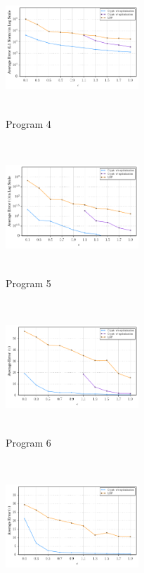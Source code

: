 \begin{figure}
          \begin{subfigure}[b]{0.3\textwidth}
    \qquad    \includegraphics[width=5cm,height=5cm]{test44.pdf}
        \caption{Program 4}
        \label{fig:mouse}\end{subfigure}
          \begin{subfigure}[b]{0.3\textwidth}
    \qquad    \includegraphics[width=5cm,height=5cm]{test55.pdf}
        \caption{Program 5}
        \label{fig:mouse}\end{subfigure}
          \begin{subfigure}[b]{0.3\textwidth}
    \qquad    \includegraphics[width=5cm,height=5cm]{test66.pdf}
        \caption{Program 6}
        \label{fig:mouse}\end{subfigure}
          \begin{subfigure}[b]{0.3\textwidth}
    \qquad    \includegraphics[width=5cm,height=5cm]{test7.pdf}

\end{subfigure}
\end{figure}
